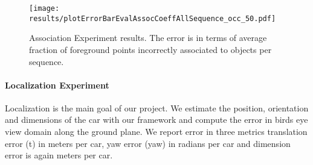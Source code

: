 \begin{figure*}
  \texttt{[image: results/plotErrorBarEvalAssocCoeffAllSequence\_occ\_50.pdf]}
  \caption{Association Experiment results. The error is in terms of average fraction of foreground points incorrectly associated to objects per sequence. }
  \label{fig:assoc-occ-results}
\end{figure*}


\paragraph{Localization Experiment}
Localization is the main goal of our project. We estimate the position, orientation and dimensions of the car with our framework and compute the error in birds eye view domain along the ground plane. We report error in three metrics translation error (t) in meters per car, yaw error (yaw) in radians per car and dimension error is again meters per car.


